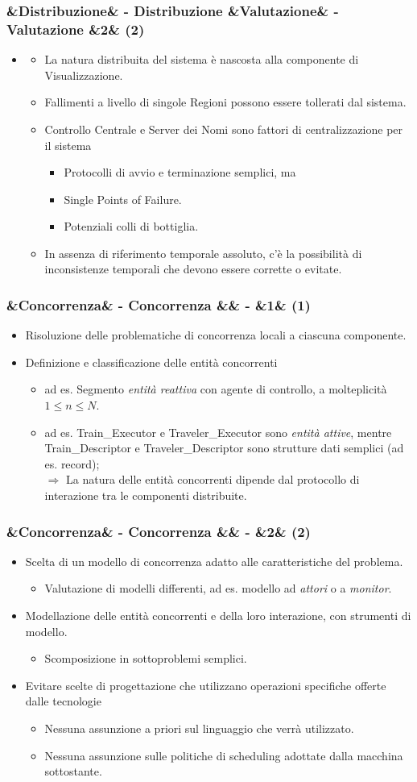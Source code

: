 \documentclass[slidestop,compress,blackandwhite]{beamer}
\newcommand{\cm}[1]{\vspace{#1cm}}
\newcommand{\newtitle}[4]{
	#1 
	\ifx&#2&%
	\else
  		\large- #2
	\fi
	\ifx&#3&%
	\else
  		\small- #3
	\fi
	\ifx&#4&%
	\else
  		\normalsize (#4)
	\fi
}
\newcommand{\newframe}[5]{
	\begin{frame}
		\frametitle{\newtitle{#1}{#2}{#3}{#4}}
		#5
	\end{frame}
}
\newcommand{\myitemize}[1]{
	\begin{itemize}\itemsep4pt
	#1
	\end{itemize}
}
\begin{document}
	\newframe{}{Distribuzione}{Valutazione}{2}{
		\myitemize {
			\item[] 
				\myitemize {
						\item La natura distribuita del sistema è nascosta alla componente di Visualizzazione.
						\item Fallimenti a livello di singole Regioni possono essere tollerati dal sistema.
						\item Controllo Centrale e Server dei Nomi sono fattori di centralizzazione per il sistema \\
							\myitemize {
								\item Protocolli di avvio e terminazione semplici, ma
								\item Single Points of Failure.
								\item Potenziali colli di bottiglia.
							}
						
						\item In assenza di riferimento temporale assoluto, c'è la possibilità di inconsistenze temporali che devono essere corrette o evitate.
						
				}
		}
	}
	
	
	\newframe{}{Concorrenza}{}{1}{
		\justifying
		\cm{0.3}
		\myitemize {
			\item Risoluzione delle problematiche di concorrenza locali a ciascuna componente.
			\cm{0.2}
			\item Definizione e classificazione delle entità concorrenti
			\myitemize{
					\item ad es. Segmento {\em entità reattiva} con agente di controllo, a molteplicità $1\le n\le N$.
					\item ad es. Train\_Executor e Traveler\_Executor sono {\em entità attive}, mentre Train\_Descriptor e Traveler\_Descriptor sono strutture dati semplici (ad es. record);\\[0.2cm]
					$\Rightarrow$ La natura delle entità concorrenti dipende dal protocollo di interazione tra le componenti distribuite.
				}	
		}
	}
	
	
	\newframe{}{Concorrenza}{}{2}{
		\justifying
		\cm{0.3}
		\myitemize {
			\item Scelta di un modello di concorrenza adatto alle caratteristiche del problema.
				\myitemize{
					\item Valutazione di modelli differenti, ad es. modello ad {\em attori} o a {\em monitor}.
				}
			\item Modellazione delle entità concorrenti e della loro interazione, con strumenti di modello.
				\myitemize {
					\item Scomposizione in sottoproblemi semplici.
				}
			\item Evitare scelte di progettazione che utilizzano operazioni specifiche offerte dalle tecnologie
				\myitemize {
					\item Nessuna assunzione a priori sul linguaggio che verrà utilizzato.
					\item Nessuna assunzione sulle politiche di scheduling adottate dalla macchina sottostante.
				}
		}
		
	}
	
\end{document}
